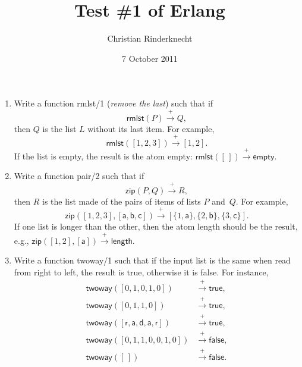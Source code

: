 \documentclass[11pt,a4paper]{article}
\title{Test \#1 of \textsf{Erlang}}
\author{Christian Rinderknecht}
\date{7 October 2011}
\newcommand\fun[1]{\textsf{#1}}
\begin{document}
\maketitle

\thispagestyle{empty}

\begin{enumerate}

  \item Write a function \fun{rmlst/1} (\emph{remove the last}) such
    that if \[\fun{rmlst}(P) \xrightarrow{+} Q,\] then \(Q\) is the
    list \(L\) without its last item. For example,
    \[\fun{rmlst}([1,2,3]) \xrightarrow{+} [1,2].\] If the list is
    empty, the result is the atom \fun{empty}: \(\fun{rmlst}([\,])
    \xrightarrow{+} \fun{empty}\).

  \item Write a function \fun{pair/2} such that if \[\fun{zip}(P,Q)
    \xrightarrow{+} R,\] then \(R\) is the list made of the pairs of
    items of lists \(P\) and~\(Q\). For example,
    \[\fun{zip}([1,2,3],[\fun{a},\fun{b},\fun{c}]) \xrightarrow{+}
          [\{1,\fun{a}\}, \{2,\fun{b}\}, \{3,\fun{c}\}].\] If one list
          is longer than the other, then the atom \fun{length} should
          be the result, e.g., \(\fun{zip}([1,2],[\fun{a}])
          \xrightarrow{+} \fun{length}\).

  \item Write a function \fun{twoway/1} such that if the input list
    is the same when read from right to left, the result is
    \fun{true}, otherwise it is \fun{false}. For instance,
    \begin{align*}
      \fun{twoway}([0,1,0,1,0]) &\xrightarrow{+} \fun{true},\\
      \fun{twoway}([0,1,1,0]) &\xrightarrow{+} \fun{true},\\
      \fun{twoway}([\fun{r},\fun{a},\fun{d},\fun{a},\fun{r}])
      &\xrightarrow{+} \fun{true},\\
      \fun{twoway}([0,1,1,0,0,1,0]) &\xrightarrow{+} \fun{false},\\
      \fun{twoway}([\,]) &\xrightarrow{+} \fun{false}.
    \end{align*}

\end{enumerate}
\end{document}
